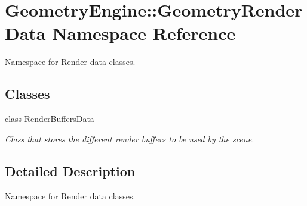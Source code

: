 \hypertarget{namespace_geometry_engine_1_1_geometry_render_data}{}\section{Geometry\+Engine\+::Geometry\+Render\+Data Namespace Reference}
\label{namespace_geometry_engine_1_1_geometry_render_data}


Namespace for Render data classes.  


\subsection*{Classes}
\begin{DoxyCompactItemize}
\item 
class \mbox{\hyperlink{class_geometry_engine_1_1_geometry_render_data_1_1_render_buffers_data}{Render\+Buffers\+Data}}
\begin{DoxyCompactList}\small\item\em Class that stores the different render buffers to be used by the scene. \end{DoxyCompactList}\end{DoxyCompactItemize}


\subsection{Detailed Description}
Namespace for Render data classes. 